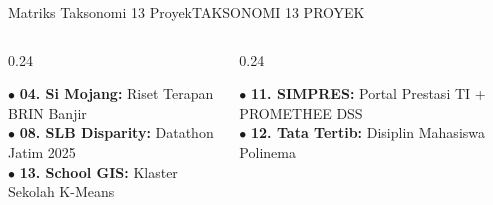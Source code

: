 \documentclass[aspectratio=169,11pt]{beamer}
\begin{document}
\begin{frame}{Matriks Taksonomi 13 Proyek}{TAKSONOMI 13 PROYEK}
\begin{columns}[t]
    \begin{column}{0.24\textwidth}
      \begin{tcolorbox}[colback=brandCardBg,colframe=brandBorder,arc=2mm,boxrule=0.6pt,boxsep=2pt,top=3pt,bottom=3pt,title={\scriptsize \bfseries \color{brandNavy} C. Geospasial \& GIS}]
        {\tiny \color{brandDark}
        $\bullet$ \textbf{04. Si Mojang:} Riset Terapan BRIN Banjir \\ \vspace{2pt}
        $\bullet$ \textbf{08. SLB Disparity:} Datathon Jatim 2025 \\ \vspace{2pt}
        $\bullet$ \textbf{13. School GIS:} Klaster Sekolah K-Means
        }
      \end{tcolorbox}
    \end{column}

    \begin{column}{0.24\textwidth}
      \begin{tcolorbox}[colback=brandCardBg,colframe=brandBorder,arc=2mm,boxrule=0.6pt,boxsep=2pt,top=3pt,bottom=3pt,title={\scriptsize \bfseries \color{brandNavy} D. Enterprise \& SPK}]
        {\tiny \color{brandDark}
        $\bullet$ \textbf{11. SIMPRES:} Portal Prestasi TI + PROMETHEE DSS \\ \vspace{2pt}
        $\bullet$ \textbf{12. Tata Tertib:} Disiplin Mahasiswa Polinema
        }
      \end{tcolorbox}
    \end{column}
  \end{columns}
\end{frame}
\end{document}

